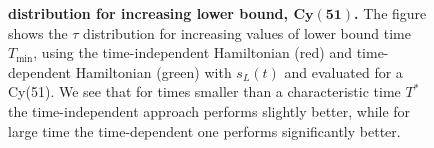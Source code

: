 \begin{figure}[ht]
  \centering
  \caption[$\tau$ distribution for increasing lower bound time.]{\textbf{\bm{$\tau$} distribution for increasing lower bound, $\bm{Cy(51)}$. }The figure shows the $\tau$ distribution for increasing values of lower bound time $T_{\min}$, using the time-independent Hamiltonian (red) and time-dependent Hamiltonian (green) with $s_L(t)$ and evaluated for a Cy(51). We see that for times smaller than a characteristic time $T^*$ the time-independent approach performs slightly better, while for large time the time-dependent one performs significantly better.}
  \label{fig:tau_increasing_time}
\end{figure}

